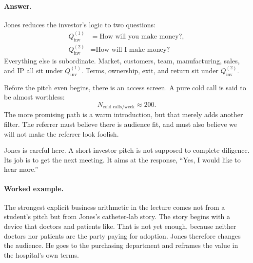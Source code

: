 \paragraph{Answer.} Jones reduces the investor's logic to two questions:
\begin{align}
Q_{\text{inv}}^{(1)} &= \text{How will you make money?},\\
Q_{\text{inv}}^{(2)} &= \text{How will I make money?}
\end{align}
Everything else is subordinate. Market, customers, team, manufacturing, sales, and IP all sit under \(Q_{\text{inv}}^{(1)}\). Terms, ownership, exit, and return sit under \(Q_{\text{inv}}^{(2)}\).

Before the pitch even begins, there is an access screen. A pure cold call is said to be almost worthless:
\begin{equation}
N_{\text{cold calls/week}} \approx 200.
\end{equation}
The more promising path is a warm introduction, but that merely adds another filter. The referrer must believe there is audience fit, and must also believe we will not make the referrer look foolish.

Jones is careful here. A short investor pitch is not supposed to complete diligence. Its job is to get the next meeting. It aims at the response, “Yes, I would like to hear more.”

\paragraph{Worked example.} The strongest explicit business arithmetic in the lecture comes not from a student's pitch but from Jones's catheter-lab story. The story begins with a device that doctors and patients like. That is not yet enough, because neither doctors nor patients are the party paying for adoption. Jones therefore changes the audience. He goes to the purchasing department and reframes the value in the hospital's own terms.

